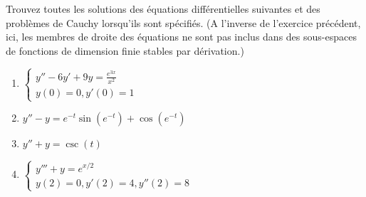 
\begin{exercice}\label{exoEqsDiff0008}

Trouvez toutes les solutions des équations différentielles suivantes et des problèmes de Cauchy lorsqu'ils sont spécifiés. (A l'inverse de l'exercice précédent, ici, les membres de droite des équations ne sont pas inclus dans des sous-espaces de fonctions de dimension finie stables par dérivation.)
\begin{multicols}{2}
	\begin{enumerate}
		\item 	
			$ \left\{ \begin{array}{l}
			y'' - 6y' + 9y = \frac{e^{3x}}{x^2}\\
			y(0) = 0, y'(0)=1 
			\end{array} \right. $
		\item
			 $ y'' - y = e^{-t}\sin(e^{-t}) + \cos(e^{-t}) $
		\item 
			$ y'' + y = \csc(t) $
		\item
			 $ \left\{ \begin{array}{l}
			y''' + y =  e^{x/2} \\
			y(2) = 0, y'(2)=4, y''(2)=8
			\end{array} \right. $
	\end{enumerate}
\end{multicols}


\end{exercice}

